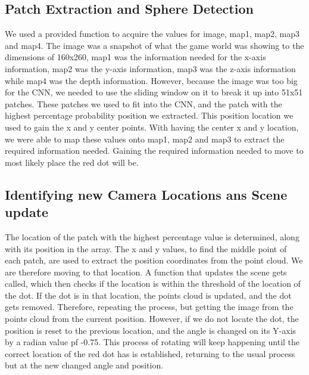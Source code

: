 \documentclass[a4paper,10pt]{article}
\begin{document}
\subsection{Patch Extraction and Sphere Detection}
We used a provided function to acquire the values for image, map1, map2, map3 and map4. The image was a snapshot of what the game world was showing to the dimensions of 160x260, map1 was the information needed for the x-axis information, map2 was the y-axis information, map3 was the z-axis information while map4 was the depth information. However, because the image was too big for the CNN, we needed to use the sliding window on it to break it up into 51x51 patches. These patches we used to fit into the CNN, and the patch with the highest percentage probability position we extracted. This position location we used to gain the x and y center points. With having the center x and y location, we were able to map these values onto map1, map2 and map3 to extract the required information needed. Gaining the required information needed to move to most likely place the red dot will be.




\subsection{Identifying new Camera Locations ans Scene update}
The location of the patch with the highest percentage value is determined, along with its position in the array. The x and y values, to find the middle point of each patch, are used to extract the position coordinates from the point cloud. We are therefore moving to that location. A function that updates the scene gets called, which then checks if the location is within the threshold of the location of the dot. If the dot is in that location, the points cloud is updated, and the dot gets removed. Therefore, repeating the process, but getting the image from the points cloud from the current position. However, if we do not locate the dot, the position is reset to the previous location, and the angle is changed on its Y-axis by a radian value pf -0.75. This process of rotating will keep happening until the correct location of the red dot has is established, returning to the usual process but at the new changed angle and position.



\end{document}
